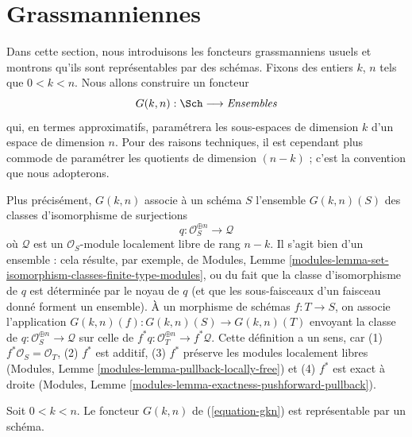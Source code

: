 \section{Grassmanniennes}
\label{section-grassmannian}

\noindent
Dans cette section, nous introduisons les foncteurs grassmanniens usuels et
montrons qu'ils sont représentables par des schémas. Fixons des entiers
$k$, $n$ tels que $0 < k < n$. Nous allons construire un foncteur
\begin{equation}
\label{equation-gkn}
G(k, n) : \Sch \longrightarrow \textit{Ensembles}
\end{equation}
qui, en termes approximatifs, paramétrera les sous-espaces de dimension $k$
d'un espace de dimension $n$. Pour des raisons techniques, il est cependant
plus commode de paramétrer les quotients de dimension $(n - k)$ ; c'est la
convention que nous adopterons.

\medskip\noindent
Plus précisément, $G(k, n)$ associe à un schéma $S$ l'ensemble
$G(k, n)(S)$ des classes d'isomorphisme de surjections
$$
q : \mathcal{O}_S^{\oplus n} \longrightarrow \mathcal{Q}
$$
où $\mathcal{Q}$ est un $\mathcal{O}_S$-module localement libre de rang
$n - k$. Il s'agit bien d'un ensemble : cela résulte, par exemple,
de Modules,
Lemme \ref{modules-lemma-set-isomorphism-classes-finite-type-modules},
ou du fait que la classe d'isomorphisme de $q$ est déterminée par le noyau de $q$
(et que les sous-faisceaux d'un faisceau donné forment un ensemble).
À un morphisme de schémas $f : T \to S$, on associe l'application
$G(k, n)(f) : G(k, n)(S) \to G(k, n)(T)$ envoyant la classe de
$q : \mathcal{O}_S^{\oplus n} \longrightarrow \mathcal{Q}$ sur celle de
$f^*q : \mathcal{O}_T^{\oplus n} \longrightarrow f^*\mathcal{Q}$.
Cette définition a un sens, car (1) $f^*\mathcal{O}_S = \mathcal{O}_T$,
(2) $f^*$ est additif, (3) $f^*$ préserve les modules localement libres
(Modules, Lemme \ref{modules-lemma-pullback-locally-free}) et (4) $f^*$
est exact à droite (Modules,
Lemme \ref{modules-lemma-exactness-pushforward-pullback}).

\begin{lemma}
\label{lemma-gkn-representable}
Soit $0 < k < n$. Le foncteur $G(k, n)$ de (\ref{equation-gkn}) est
représentable par un schéma.
\end{lemma}

